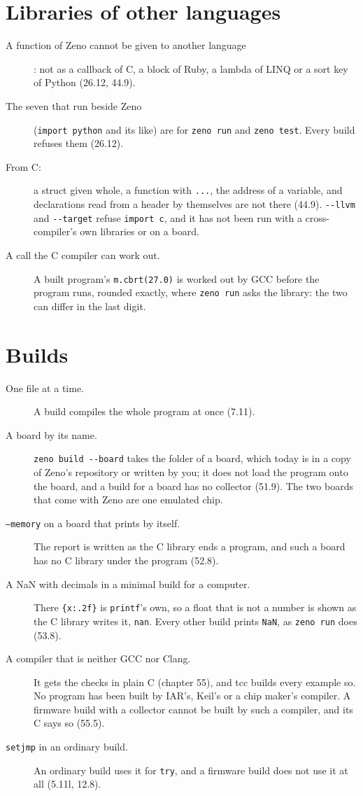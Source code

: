 \section{Libraries of other languages}

\begin{description}
\item[A function of Zeno cannot be given to another language]: not as
  a callback of C, a block of Ruby, a lambda of LINQ or a sort key of
  Python (26.12, 44.9).
\item[The seven that run beside Zeno] (\verb|import python| and its
  like) are for \verb|zeno run| and \verb|zeno test|. Every build
  refuses them (26.12).
\item[From C:] a struct given whole, a function with \verb|...|, the
  address of a variable, and declarations read from a header by
  themselves are not there (44.9). \verb|--llvm| and \verb|--target|
  refuse \verb|import c|, and it has not been run with a
  cross-compiler's own libraries or on a board.
\item[A call the C compiler can work out.] A built program's
  \verb|m.cbrt(27.0)| is worked out by GCC before the program runs,
  rounded exactly, where \verb|zeno run| asks the library: the two can
  differ in the last digit.
\end{description}

\section{Builds}

\begin{description}
\item[One file at a time.] A build compiles the whole program at once
  (7.11).
\item[A board by its name.] \verb|zeno build --board| takes the
  folder of a board, which today is in a copy of Zeno's repository or
  written by you; it does not load the program onto the board, and a
  build for a board has no collector (51.9). The two boards that come
  with Zeno are one emulated chip.
\item[\texttt{--memory} on a board that prints by itself.] The
  report is written as the C library ends a program, and such a board
  has no C library under the program (52.8).
\item[A NaN with decimals in a minimal build for a computer.] There
  \verb|{x:.2f}| is \verb|printf|'s own, so a float that is not a
  number is shown as the C library writes it, \verb|nan|. Every other
  build prints \verb|NaN|, as \verb|zeno run| does (53.8).
\item[A compiler that is neither GCC nor Clang.] It gets the checks
  in plain C (chapter 55), and tcc builds every example so. No program
  has been built by IAR's, Keil's or a chip maker's compiler. A
  firmware build with a collector cannot be built by such a compiler,
  and its C says so (55.5).
\item[\texttt{setjmp} in an ordinary build.] An ordinary build uses it
  for \verb|try|, and a firmware build does not use it at all (5.11l,
  12.8).
\end{description}

